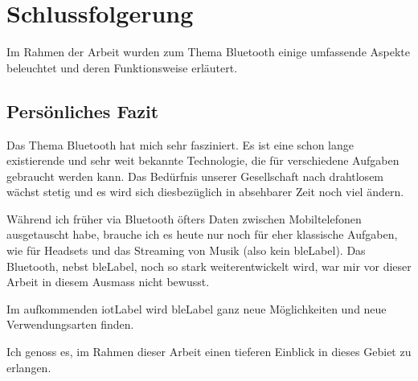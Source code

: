 \chapter{Schlussfolgerung}
Im Rahmen der Arbeit wurden zum Thema Bluetooth einige umfassende Aspekte beleuchtet und deren Funktionsweise erläutert.

\section{Persönliches Fazit}
Das Thema Bluetooth hat mich sehr fasziniert.
Es ist eine schon lange existierende und sehr weit bekannte Technologie, die für verschiedene Aufgaben gebraucht werden kann.
Das Bedürfnis unserer Gesellschaft nach drahtlosem wächst stetig und es wird sich diesbezüglich in absehbarer Zeit noch viel ändern.

Während ich früher via Bluetooth öfters Daten zwischen Mobiltelefonen ausgetauscht habe, brauche ich es heute nur noch für eher klassische Aufgaben, wie für Headsets und das Streaming von Musik (also kein \gls{bleLabel}).
Das Bluetooth, nebst \gls{bleLabel}, noch so stark weiterentwickelt wird, war mir vor dieser Arbeit in diesem Ausmass nicht bewusst.

Im aufkommenden \gls{iotLabel} wird \gls{bleLabel} ganz neue Möglichkeiten und neue Verwendungsarten finden.

Ich genoss es, im Rahmen dieser Arbeit einen tieferen Einblick in dieses Gebiet zu erlangen.
